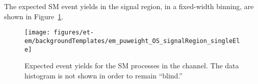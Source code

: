 The expected SM event yields in the signal region, in a fixed-width
binning, are shown in Figure~\ref{fig:em_sm_template}.

\begin{figure}\centering
  \texttt{[image: figures/et-em/backgroundTemplates/em\_puweight\_OS\_signalRegion\_singleEle]}
  \caption{\label{fig:em_sm_template} Expected event yields for the SM
    processes in the \tetm channel.  The data histogram is not shown
    in order to remain ``blind.''}
\end{figure}

